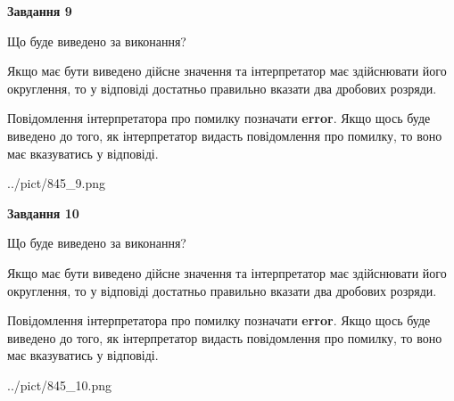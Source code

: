 \documentclass[12pt, ukrainian]{article}
\begin{document}
{\begin {Large}
{\begin {center}\textbf{Завдання 9}\end {center}}\par
Що буде виведено за виконання? \par

Якщо має бути виведено дійсне значення та інтерпретатор має здійснювати його округлення, 
то у відповіді достатньо правильно вказати два дробових розряди.

Повідомлення інтерпретатора про помилку позначати \textbf{error}.
Якщо щось буде виведено до того, як інтерпретатор видасть повідомлення про помилку, 
то воно має вказуватись у відповіді. \par

\begin{center}
	{../pict/845_9.png}
\end{center}
\newpage

{\begin {center}\textbf{Завдання 10}\end {center}}\par
Що буде виведено за виконання? \par

Якщо має бути виведено дійсне значення та інтерпретатор має здійснювати його округлення, 
то у відповіді достатньо правильно вказати два дробових розряди.

Повідомлення інтерпретатора про помилку позначати \textbf{error}.
Якщо щось буде виведено до того, як інтерпретатор видасть повідомлення про помилку, 
то воно має вказуватись у відповіді. \par

\begin{center}
	{../pict/845_10.png}
\end{center}
\newpage

\end {Large}}
\end{document}
